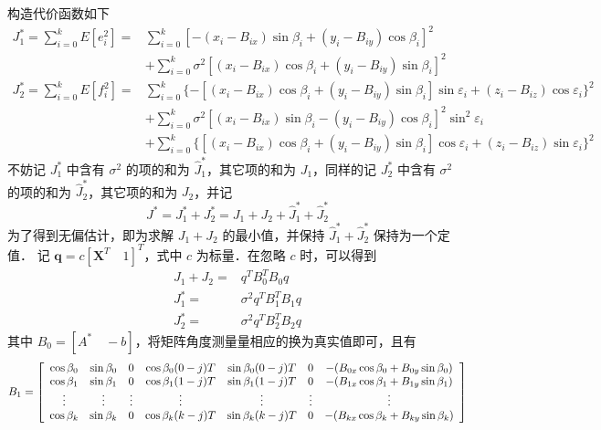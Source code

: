 构造代价函数如下
\begin{equation}
	\begin{split}
		J_1^* = \sum_{i=0}^{k}E[e_i^2] =& \sum_{i=0}^{k}[-(x_i -B_{ix})\sin\beta_i + (y_i -B_{iy})\cos\beta_i]^2 \\
		&+ \sum_{i=0}^{k}\sigma^2[(x_i -B_{ix})\cos\beta_i + (y_i -B_{iy})\sin\beta_i]^2 \\
		J_2^* = \sum_{i=0}^{k}E[f_i^2] = &\sum_{i=0}^{k}\lbrace-[(x_i -B_{ix})\cos\beta_i + (y_i -B_{iy})\sin\beta_i]\sin\varepsilon_i + (z_i-B_{iz})\cos\varepsilon_i \rbrace ^2 \\
		& + \sum_{i=0}^{k}\sigma^2 [(x_i -B_{ix})\sin\beta_i - (y_i -B_{iy})\cos\beta_i]^2 \sin^2 \varepsilon_i \\
		&+ \sum_{i=0}^{k}\lbrace [(x_i -B_{ix})\cos\beta_i + (y_i -B_{iy})\sin\beta_i]\cos\varepsilon_i + (z_i -B_{iz})\sin\varepsilon_i \rbrace ^2 
	\end{split}
\end{equation}
不妨记 $J_1^*$ 中含有 $\sigma^2$ 的项的和为 $\hat{J}_1^*$，其它项的和为 $J_1$，同样的记 $J_2^*$ 中含有 $\sigma^2$ 的项的和为 $\hat{J}_2^*$，其它项的和为 $J_2$，并记
\begin{equation}
	J^* = J_1^* + J_2^* = J_1 + J_2 + \hat{J}_1^* + \hat{J}_2^*
\end{equation}
为了得到无偏估计，即为求解 $J_1 +J_2$ 的最小值，并保持 $\hat{J}_1^* + \hat{J}_2^*$ 保持为一个定值．
记 $\bm{q} = c[\bm{X}^T \quad 1]^T$，式中 $c$ 为标量．在忽略 $c$ 时，可以得到
\begin{equation}
	\begin{split}
		J_1 + J_2 =& q^T B_0^T B_0 q \\
		J_1^* =& \sigma^2 q^T B_1^T B_1 q\\
		J_2^* =& \sigma^2 q^T B_2^T B_2 q
	\end{split}	
\end{equation}
其中 $B_0 = [A^* \quad -b]$，将矩阵角度测量量相应的换为真实值即可，且有
\begin{equation}
	\vspace{-10pt}
	B_1 = \left[\begin{array}{ccccccc}
		\cos\beta_0 & \sin\beta_0 & 0 & \cos\beta_0(0-j)T & \sin\beta_0 (0-j)T & 0 & -(B_{0x}\cos\beta_0+B_{0y}\sin\beta_0) \\
		\cos\beta_1 & \sin\beta_1 & 0 & \cos\beta_1(1-j)T & \sin\beta_1 (1-j)T & 0 & -(B_{1x}\cos\beta_1+B_{1y}\sin\beta_1) \\
		\vdots & \vdots & \vdots & \vdots & \vdots & \vdots & \vdots \\
		\cos\beta_k & \sin\beta_k & 0 & \cos\beta_k(k-j)T & \sin\beta_k (k-j)T & 0 & -(B_{kx}\cos\beta_k+B_{ky}\sin\beta_k)
	\end{array}\right] 
\end{equation}
